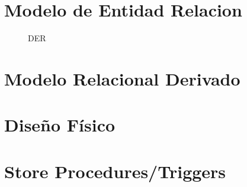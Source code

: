\documentclass[a4paper,11pt]{article}
\begin{document}


\newpage

\tableofcontents


\newpage

\section{Modelo de Entidad Relacion}

\begin{figure}[H]
\centering
{}
\caption{DER}
\end{figure}



\newpage

\section{Modelo Relacional Derivado}



\newpage

\section{Dise\~{n}o F\'isico}



\newpage

\section{Store Procedures/Triggers}



\newpage
\end{document}
